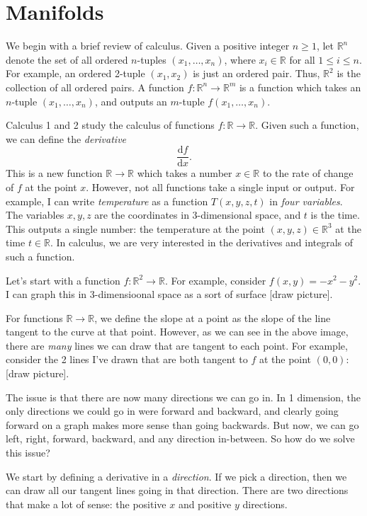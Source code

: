 \section{Manifolds}

We begin with a brief review of calculus. Given a positive integer $n\geq 1$, let $\mathbb{R} ^n$ denote the set of all ordered $n$-tuples $(x_1, \ldots , x_n)$, where $x_i\in\mathbb{R} $ for all $1\leq i\leq n$. For example, an ordered 2-tuple $(x_1,x_2)$ is just an ordered pair. Thus, $\mathbb{R} ^2$ is the collection of all ordered pairs. A function $f : \mathbb{R} ^n \to \mathbb{R} ^m$ is a function which takes an $n$-tuple $(x_1, \ldots , x_n)$, and outputs an $m$-tuple $f(x_1, \ldots , x_n) $.

Calculus 1 and 2 study the calculus of functions $f : \mathbb{R}  \to \mathbb{R} $. Given such a function, we can define the \emph{derivative} 
\[
	\frac{\mathrm{d}f}{\mathrm{d}x} 
.\]
This is a new function $\mathbb{R} \to \mathbb{R} $ which takes a number $x\in\mathbb{R} $ to the rate of change of $f$ at the point $x$. However, not all functions take a single input or output. For example, I can write \emph{temperature} as a function $T(x,y,z,t)$ in \emph{four variables}. The variables $x,y,z$ are the coordinates in 3-dimensional space, and $t$ is the time. This outputs a single number: the temperature at the point $(x,y,z)\in\mathbb{R} ^3$ at the time $t\in\mathbb{R} $. In calculus, we are very interested in the derivatives and integrals of such a function.

Let's start with a function $f : \mathbb{R} ^2 \to \mathbb{R} $. For example, consider $f(x,y) = -x^2 - y^2$. I can graph this in 3-dimensioonal space as a sort of surface [draw picture].

For functions $\mathbb{R} \to \mathbb{R} $, we define the slope at a point as the slope of the line tangent to the curve at that point. However, as we can see in the above image, there are \emph{many} lines we can draw that are tangent to each point. For example, consider the 2 lines I've drawn that are both tangent to $f$ at the point $(0,0)$: [draw picture].

The issue is that there are now many directions we can go in. In 1 dimension, the only directions we could go in were forward and backward, and clearly going forward on a graph makes more sense than going backwards. But now, we can go left, right, forward, backward, and any direction in-between. So how do we solve this issue?

We start by defining a derivative in a \emph{direction}. If we pick a direction, then we can draw all our tangent lines going in that direction. There are two directions that make a lot of sense: the positive $x$ and positive $y$ directions.

